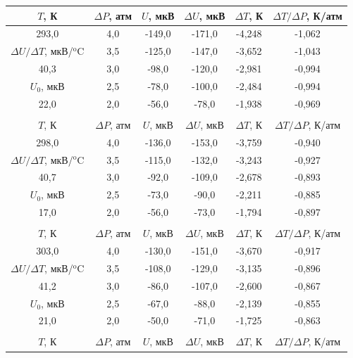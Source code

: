 \documentclass[a4paper,12pt]{article} %
\begin{document}
\begin{table}[]
    \centering
    \begin{tabular}{|c|c|c|c|c|c|}\hline
        $T$, К & $\Delta P$, атм & $U$, мкВ & $\Delta U$, мкВ & $\Delta T$, К & $\Delta T / \Delta P$, К/атм \\ \hline
        293,0 & 4,0 & -149,0 & -171,0 & -4,248 & -1,062 \\ \hline
        $\Delta U/\Delta T$, мкВ/$^\text{o}$C & 3,5 & -125,0 & -147,0 & -3,652 & -1,043 \\ \hline
        40,3 & 3,0 & -98,0 & -120,0 & -2,981 & -0,994 \\ \hline
        $U_0$, мкВ & 2,5 & -78,0 & -100,0 & -2,484 & -0,994 \\ \hline
        22,0 & 2,0 & -56,0 & -78,0 & -1,938 & -0,969 \\ \hline
        \multicolumn{6}{|c|}{} \\ \hline
        $T$, К & $\Delta P$, атм & $U$, мкВ & $\Delta U$, мкВ & $\Delta T$, К & $\Delta T / \Delta P$, К/атм \\ \hline
        298,0 & 4,0 & -136,0 & -153,0 & -3,759 & -0,940 \\ \hline
        $\Delta U/\Delta T$, мкВ/$^\text{o}$C & 3,5 & -115,0 & -132,0 & -3,243 & -0,927 \\ \hline
        40,7 & 3,0 & -92,0 & -109,0 & -2,678 & -0,893 \\ \hline
        $U_0$, мкВ & 2,5 & -73,0 & -90,0 & -2,211 & -0,885 \\ \hline
        17,0 & 2,0 & -56,0 & -73,0 & -1,794 & -0,897 \\ \hline
        \multicolumn{6}{|c|}{} \\ \hline
        $T$, К & $\Delta P$, атм & $U$, мкВ & $\Delta U$, мкВ & $\Delta T$, К & $\Delta T / \Delta P$, К/атм \\ \hline
        303,0 & 4,0 & -130,0 & -151,0 & -3,670 & -0,917 \\ \hline
        $\Delta U/\Delta T$, мкВ/$^\text{o}$C & 3,5 & -108,0 & -129,0 & -3,135 & -0,896 \\ \hline
        41,2 & 3,0 & -86,0 & -107,0 & -2,600 & -0,867 \\ \hline
        $U_0$, мкВ & 2,5 & -67,0 & -88,0 & -2,139 & -0,855 \\ \hline
        21,0 & 2,0 & -50,0 & -71,0 & -1,725 & -0,863 \\ \hline
        \multicolumn{6}{|c|}{} \\ \hline
        $T$, К & $\Delta P$, атм & $U$, мкВ & $\Delta U$, мкВ & $\Delta T$, К & $\Delta T / \Delta P$, К/атм \\ \hline

\end{tabular}
\end{table}
\end{document}
